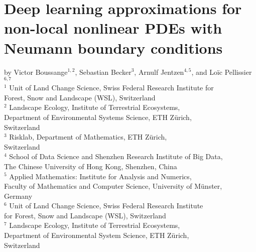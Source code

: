 \graphicspath{{./content/part_II/NonlocalPDE/figures/}}


\chapter{Deep learning approximations for non-local nonlinear PDEs with Neumann boundary conditions}
\label{sec:nonlocalPDE}

by Victor Boussange$^{1,2}$, 
Sebastian Becker$^{3}$,
Arnulf Jentzen$^{4,5}$,
and 
Lo{\"i}c Pellissier$^{6,7}$\bigskip
\\
\small{$^1$ Unit of Land Change Science, Swiss Federal Research Institute for}
\vspace{-0.1cm}\\
\small{Forest, Snow and Landscape (WSL), Switzerland}
\smallskip
\\
\small{$^2$ Landscape Ecology, Institute of Terrestrial Ecosystems,}
\vspace{-0.1cm}\\
\small{Department of Environmental Systems Science, ETH Z\"urich,}
\vspace{-0.1cm}\\
\small{Switzerland}
\smallskip
\\
\small{$^3$ Risklab, Department of Mathematics, ETH Z\"urich,}
\vspace{-0.1cm}\\
\small{Switzerland}
\smallskip
\\
\small{$^4$ School of Data Science and Shenzhen Research Institute of Big Data,}
\vspace{-0.1cm}\\
\small{The Chinese University of Hong Kong, Shenzhen, China}
\smallskip
\\
\small{$^5$ Applied Mathematics: Institute for Analysis and Numerics,}
\vspace{-0.1cm}\\
\small{Faculty of Mathematics and Computer Science, University of M{\"u}nster,}
\vspace{-0.1cm}\\
\small{Germany}
\smallskip
\\
\small{$^6$ Unit of Land Change Science, Swiss Federal Research Institute}
\vspace{-0.1cm}\\
\small{for Forest, Snow and Landscape (WSL), Switzerland}
\smallskip
\\
\small{$^7$ Landscape Ecology, Institute of Terrestrial Ecosystems,}
\vspace{-0.1cm}\\
\small{Department of Environmental System Science, ETH Z\"urich,}
\vspace{-0.1cm}\\
\small{Switzerland}
\smallskip

